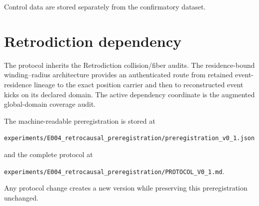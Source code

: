 Control data are stored separately from the confirmatory dataset.

\section{Retrodiction dependency}

The protocol inherits the Retrodiction collision/fiber audits. The residence-bound winding--radius architecture provides an authenticated route from retained event-residence lineage to the exact position carrier and then to reconstructed event kicks on its declared domain. The active dependency coordinate is the augmented global-domain coverage audit.

The machine-readable preregistration is stored at
\begin{center}
\texttt{experiments/E004\_retrocausal\_preregistration/preregistration\_v0\_1.json}
\end{center}
and the complete protocol at
\begin{center}
\texttt{experiments/E004\_retrocausal\_preregistration/PROTOCOL\_V0\_1.md}.
\end{center}

Any protocol change creates a new version while preserving this preregistration unchanged.
